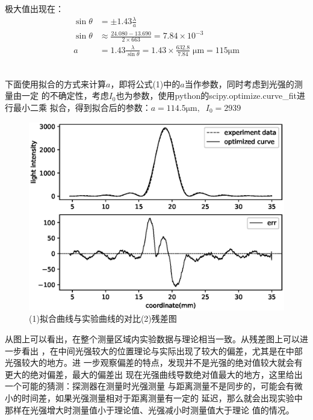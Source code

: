 \documentclass[a4paper]{ctexart}
\begin{document}
    极大值出现在：
    \begin{align*}
    \sin \theta &= \pm 1.43 \frac{\lambda}{a}\\
    \sin \theta &\approx \frac{24.080 - 13.690}{2 \times 663} = 7.84 \times 10^{-3}\\
    a &= 1.43\frac{\lambda}{\sin \theta} = 1.43 \times \frac{632.8}{7.84}\;\mathrm{\mu m} = 115 \mathrm{\mu m}
    \end{align*}
    \\
    \par 
    下面使用拟合的方式来计算$a$，即将公式(1)中的$a$当作参数，同时考虑到光强的测量由一定
    的不确定性，考虑$I_{0}$也为参数，使用python的scipy.optimize.curve\_fit进行最小二乘
    拟合，得到拟合后的参数：$a = 114.5\mathrm{\mu m},\;\;I_{0} = 2939$
    \begin{figure}[htbp]
        \centering
        \includegraphics[scale=0.8]{image/single_fit.eps}
        \caption{(1)拟合曲线与实验曲线的对比\;\;(2)残差图}
    \end{figure}
    \par 
    从图上可以看出，在整个测量区域内实验数据与理论相当一致。从残差图上可以进一步看出
    ，在中间光强较大的位置理论与实际出现了较大的偏差，尤其是在中部光强较大的地方。进
    一步观察偏差的特点，发现并不是光强的绝对值较大就会有更大的绝对偏差，最大的偏差出
    现在光强曲线导数绝对值最大的地方，这里给出一个可能的猜测：探测器在测量时光强测量
    与距离测量不是同步的，可能会有微小的时间差，如果光强测量相对于距离测量有一定的
    延迟，那么就会出现实验中那样在光强增大时测量值小于理论值、光强减小时测量值大于理论
    值的情况。
\end{document}
